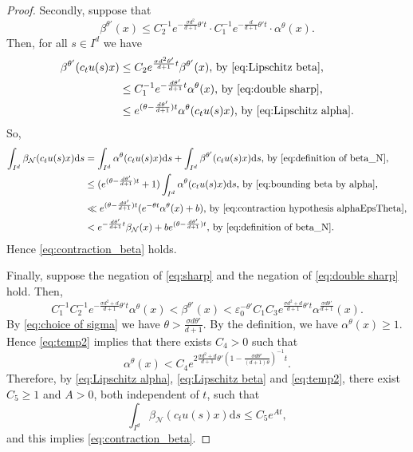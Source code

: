 \documentclass[12pt,reqno]{amsart}
\numberwithin{equation}{section}
\theoremstyle{plain}
\theoremstyle{definition}
\theoremstyle{remark}
\newcommand\cN{\mathcal{N}}
\newcommand{\eps}{\varepsilon}
\newcommand{\de}{\mathrm{d}}
\begin{document}
\begin{proof}
        Secondly, suppose that
        \begin{equation} \label{eq:double sharp}
            \beta^{\theta'}(x)\leq C_2^{-1}e^{-\frac{\sigma d^2}{d+1}\theta't}\cdot C_1^{-1}e^{-\frac{d}{d+1}\theta't}\cdot \alpha^{\theta}(x).
        \end{equation}
        Then, for all $s\in I^d$ we have
        \begin{equation} \label{eq:bounding beta by alpha}
        \begin{split}
            \beta^{\theta'}(c_tu(s)x)&\leq C_2e^{\frac{\sigma d^2\theta'}{d+1}t}\beta^{\theta'}(x) \text{, by \eqref{eq:Lipschitz beta},}\\
            &\leq C_1^{-1}e^{-\frac{d\theta'}{d+1}t}\alpha^\theta(x) \text{, by \eqref{eq:double sharp},}\\
            &\leq e^{(\theta-\frac{d\theta'}{d+1})t}\alpha^\theta(c_tu(s)x)\text{, by \eqref{eq:Lipschitz alpha}.}
        \end{split}
        \end{equation}
        So,
        \[
        \begin{split}
            \int_{I^d}\beta_\cN(c_tu(s)x)\de s &=\int_{I^d}\alpha^\theta(c_tu(s)x)\de s +\int_{I^d}\beta^{\theta'}(c_tu(s)x)\de s \text{, by \eqref{eq:definition of beta_N},}\\
            &\leq(e^{(\theta-\frac{d\theta'}{d+1})t}+1)\int_{I^d}\alpha^\theta(c_tu(s)x)\de s \text{, by \eqref{eq:bounding beta by alpha},}\\
            &\ll e^{(\theta-\frac{d\theta'}{d+1})t}(e^{-\theta t}\alpha^\theta(x)+b) \text{, by \eqref{eq:contraction hypothesis alphaEpsTheta},}\\
            &< e^{-\frac{d\theta'}{d+1}t}\beta_\cN(x)+ be^{(\theta-\frac{d\theta'}{d+1})t}\text{, by \eqref{eq:definition of beta_N}.}
        \end{split}
        \]
        Hence \eqref{eq:contraction_beta} holds.

        Finally, suppose the negation of \eqref{eq:sharp} and the negation of \eqref{eq:double sharp} hold. Then,
        \begin{equation} \label{eq:temp2}
             C_1^{-1}C_2^{-1}e^{-\frac{\sigma d^2+d}{d+1}\theta't}\alpha^{\theta}(x) < \beta^{\theta'}(x) < \eps_0^{-\theta'}C_1C_3e^{\frac{\sigma d^2+d}{d+1}\theta't}\alpha^{\frac{\sigma d\theta'}{d+1}}(x).
        \end{equation}
        By \eqref{eq:choice of sigma} we have $\theta>\frac{\sigma d\theta'}{d+1}$. By the definition, we have $\alpha^\theta(x)\geq 1$. Hence \eqref{eq:temp2} implies that there exists $C_4>0$ such that 
        \[
        \alpha^\theta(x)<C_4e^{2\frac{\sigma d^2+d}{d+1}\theta'(1-\frac{\sigma d\theta'}{(d+1)\theta})^{-1}t}.
        \]
        Therefore, by \eqref{eq:Lipschitz alpha}, \eqref{eq:Lipschitz beta} and \eqref{eq:temp2}, there exist $C_5\geq 1$ and $A>0$, both independent of $t$, such that
        \begin{equation*}
            \int_{I^d}\beta_\cN(c_tu(s)x)\de s \leq C_5e^{At},
        \end{equation*}
        and this implies \eqref{eq:contraction_beta}.


\end{proof}
\end{document}
